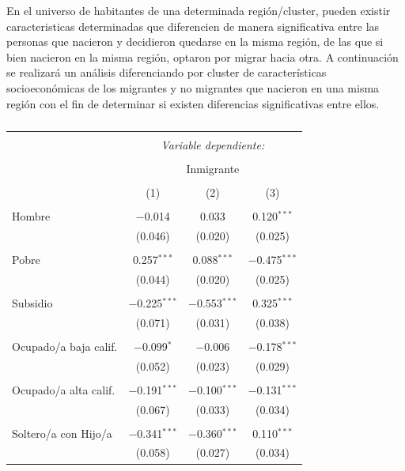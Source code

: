 \documentclass[12pt,a4paper]{article}
\begin{document}
En el universo de habitantes de una determinada región/cluster, pueden existir caracteristicas determinadas que diferencien de manera significativa entre las personas que nacieron  y decidieron quedarse en la misma región, de las que si bien nacieron en la misma región, optaron por migrar hacia otra. A continuación se realizará un análisis diferenciando por cluster  de características socioeconómicas de los migrantes y no migrantes  que nacieron en una misma región con el fin de determinar si existen diferencias significativas entre ellos. 
\newpage
\begin{table}[!htbp] \centering 
  \caption{} 
  \label{cuadro:reg_expulsion} 
\scriptsize 
\begin{tabular}{@{\extracolsep{5pt}}lccc} 
\\[-1.8ex]\hline 
\hline \\[-1.8ex] 
 & \multicolumn{3}{c}{\textit{Variable dependiente:}} \\ 
\cline{2-4} 
\\[-1.8ex] & \multicolumn{3}{c}{Inmigrante} \\ 
\\[-1.8ex] & (1) & (2) & (3)\\ 
\hline \\[-1.8ex] 
 Hombre & $-$0.014 & 0.033 & 0.120$^{***}$ \\ 
  & (0.046) & (0.020) & (0.025) \\ 
  & & & \\ 
 Pobre & 0.257$^{***}$ & 0.088$^{***}$ & $-$0.475$^{***}$ \\ 
  & (0.044) & (0.020) & (0.025) \\ 
  & & & \\ 
 Subsidio & $-$0.225$^{***}$ & $-$0.553$^{***}$ & 0.325$^{***}$ \\ 
  & (0.071) & (0.031) & (0.038) \\ 
  & & & \\ 
 Ocupado/a baja calif. & $-$0.099$^{*}$ & $-$0.006 & $-$0.178$^{***}$ \\ 
  & (0.052) & (0.023) & (0.029) \\ 
  & & & \\ 
 Ocupado/a alta calif. & $-$0.191$^{***}$ & $-$0.100$^{***}$ & $-$0.131$^{***}$ \\ 
  & (0.067) & (0.033) & (0.034) \\ 
  & & & \\ 
 Soltero/a con Hijo/a & $-$0.341$^{***}$ & $-$0.360$^{***}$ & 0.110$^{***}$ \\ 
  & (0.058) & (0.027) & (0.034) \\ 

\end{tabular}
\end{table}
\end{document}
